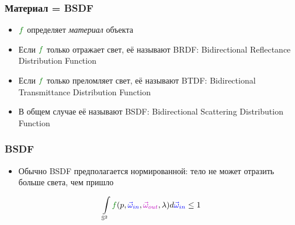 \documentclass{beamer}
\begin{document}
\begin{frame}[fragile]
\frametitle{Материал = BSDF}
\begin{itemize}
\item \begin{math}{\color{green}f}\end{math} определяет \textit{материал} объекта
\pause 
\item Если \begin{math}{\color{green}f}\end{math} только отражает свет, её называют BRDF: Bidirectional Reflectance Distribution Function
\pause 
\item Если \begin{math}{\color{green}f}\end{math} только преломляет свет, её называют BTDF: Bidirectional Transmittance Distribution Function
\pause 
\item В общем случае её называют BSDF: Bidirectional Scattering Distribution Function
\end{itemize}
\end{frame}

\begin{frame}[fragile]
\frametitle{BSDF}
\begin{itemize}
\item Обычно BSDF предполагается нормированной: тело не может отразить больше света, чем пришло
\end{itemize}
\begin{equation}
\int\limits_{\mathbb S^2} {\color{green}f}(p, {\color{blue}\vec\omega_{in}}, {\color{magenta}\vec\omega_{out}}, \lambda) d{\color{blue}\vec\omega_{in}} \leq 1
\end{equation}
\end{frame}
\end{document}
